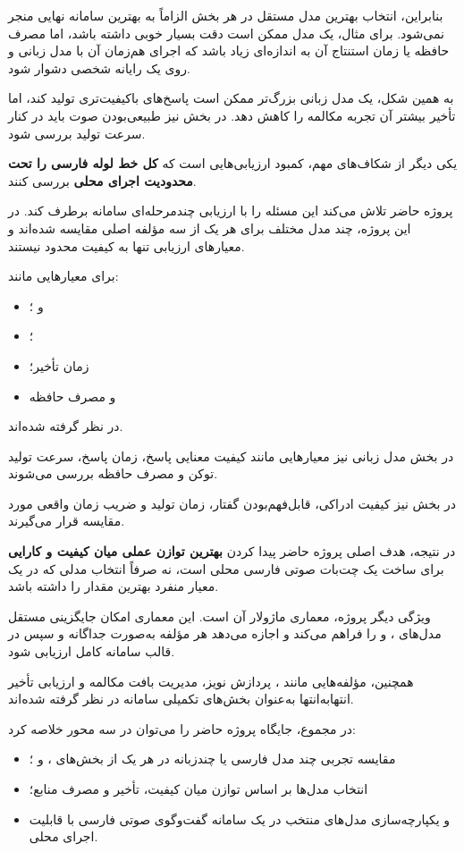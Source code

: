 بنابراین، انتخاب بهترین مدل مستقل در هر بخش الزاماً به بهترین
سامانه نهایی منجر نمی‌شود.
برای مثال، یک مدل  ممکن است دقت بسیار خوبی داشته باشد،
اما مصرف حافظه یا زمان استنتاج آن به اندازه‌ای زیاد باشد که
اجرای هم‌زمان آن با مدل زبانی و  روی یک رایانه شخصی
دشوار شود.

به همین شکل، یک مدل زبانی بزرگ‌تر ممکن است پاسخ‌های باکیفیت‌تری
تولید کند، اما تأخیر بیشتر آن تجربه مکالمه را کاهش دهد.
در بخش  نیز طبیعی‌بودن صوت باید در کنار سرعت تولید بررسی شود.

یکی دیگر از شکاف‌های مهم، کمبود ارزیابی‌هایی است که
\textbf{کل خط لوله فارسی را تحت محدودیت اجرای محلی}
بررسی کنند.

پروژه حاضر تلاش می‌کند این مسئله را با ارزیابی چندمرحله‌ای
سامانه برطرف کند.
در این پروژه، چند مدل مختلف برای هر یک از سه مؤلفه اصلی
مقایسه شده‌اند و معیارهای ارزیابی تنها به کیفیت محدود نیستند.

برای  معیارهایی مانند:

\begin{itemize}
    \item {} و ؛
    \item {}؛
    \item زمان تأخیر؛
    \item و مصرف حافظه
\end{itemize}

در نظر گرفته شده‌اند.

در بخش مدل زبانی نیز معیارهایی مانند کیفیت معنایی پاسخ،
زمان پاسخ، سرعت تولید توکن و مصرف حافظه بررسی می‌شوند.

در بخش  نیز کیفیت ادراکی، قابل‌فهم‌بودن گفتار،
زمان تولید و ضریب زمان واقعی مورد مقایسه قرار می‌گیرند.

در نتیجه، هدف اصلی پروژه حاضر پیدا کردن
\textbf{بهترین توازن عملی میان کیفیت و کارایی}
برای ساخت یک چت‌بات صوتی فارسی محلی است، نه صرفاً انتخاب
مدلی که در یک معیار منفرد بهترین مقدار را داشته باشد.

ویژگی دیگر پروژه، معماری ماژولار آن است.
این معماری امکان جایگزینی مستقل مدل‌های ،  و  را
فراهم می‌کند و اجازه می‌دهد هر مؤلفه به‌صورت جداگانه و سپس
در قالب سامانه کامل ارزیابی شود.

همچنین، مؤلفه‌هایی مانند
،
پردازش نویز،
مدیریت بافت مکالمه
و ارزیابی تأخیر انتهابه‌انتها
به‌عنوان بخش‌های تکمیلی سامانه در نظر گرفته شده‌اند.

در مجموع، جایگاه پروژه حاضر را می‌توان در سه محور خلاصه کرد:

\begin{itemize}

    \item مقایسه تجربی چند مدل فارسی یا چندزبانه در هر یک از
    بخش‌های ،  و ؛

    \item انتخاب مدل‌ها بر اساس توازن میان کیفیت، تأخیر و
    مصرف منابع؛

    \item و یکپارچه‌سازی مدل‌های منتخب در یک سامانه گفت‌وگوی
    صوتی فارسی با قابلیت اجرای محلی.

\end{itemize}

